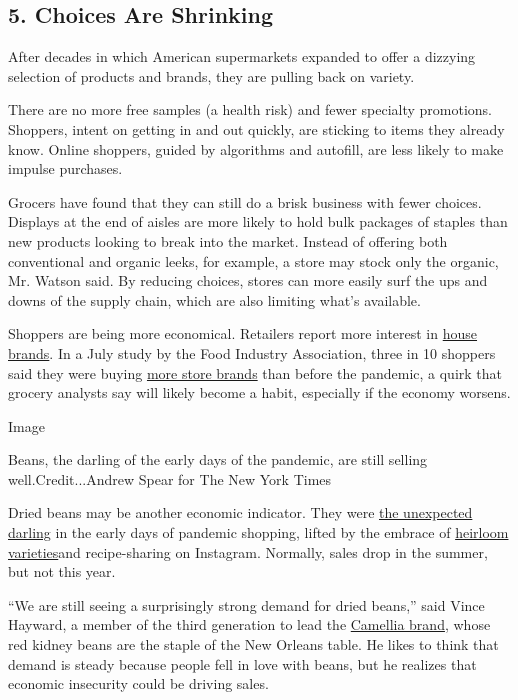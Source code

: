 \hypertarget{5-choices-are-shrinking}{%
\subsection{5. Choices Are Shrinking}\label{5-choices-are-shrinking}}

After decades in which American supermarkets expanded to offer a
dizzying selection of products and brands, they are pulling back on
variety.

There are no more free samples (a health risk) and fewer specialty
promotions. Shoppers, intent on getting in and out quickly, are sticking
to items they already know. Online shoppers, guided by algorithms and
autofill, are less likely to make impulse purchases.

Grocers have found that they can still do a brisk business with fewer
choices. Displays at the end of aisles are more likely to hold bulk
packages of staples than new products looking to break into the market.
Instead of offering both conventional and organic leeks, for example, a
store may stock only the organic, Mr. Watson said. By reducing choices,
stores can more easily surf the ups and downs of the supply chain, which
are also limiting what's available.

Shoppers are being more economical. Retailers report more interest in
\href{https://www.foodnavigator-usa.com/Article/2020/09/04/Target-Good-Gather-private-label-line-to-nearly-double-number-of-SKUs?utm_source=newsletter_daily\&utm_medium=email\&utm_campaign=04-Sep-2020}{house
brands}. In a July study by the Food Industry Association, three in 10
shoppers said they were buying
\href{https://www.fmi.org/our-research/research-reports/u-s-grocery-shopper-trends}{more
store brands} than before the pandemic, a quirk that grocery analysts
say will likely become a habit, especially if the economy worsens.

Image

Beans, the darling of the early days of the pandemic, are still selling
well.Credit...Andrew Spear for The New York Times

Dried beans may be another economic indicator. They were
\href{https://www.nytimes3xbfgragh.onion/2020/03/22/business/coronavirus-beans-sales.html}{the
unexpected darling} in the early days of pandemic shopping, lifted by
the embrace of \href{https://www.ranchogordo.com/}{heirloom
varieties}and recipe-sharing on Instagram. Normally, sales drop in the
summer, but not this year.

``We are still seeing a surprisingly strong demand for dried beans,''
said Vince Hayward, a member of the third generation to lead the
\href{https://www.camelliabrand.com/about-camellia/}{Camellia brand},
whose red kidney beans are the staple of the New Orleans table. He likes
to think that demand is steady because people fell in love with beans,
but he realizes that economic insecurity could be driving sales.

